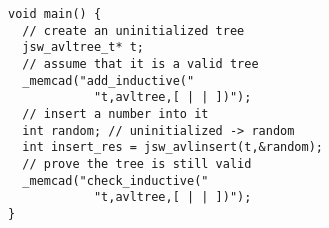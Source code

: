 \begin{verbatim}
void main() {
  // create an uninitialized tree
  jsw_avltree_t* t;
  // assume that it is a valid tree
  _memcad("add_inductive("
            "t,avltree,[ | | ])");
  // insert a number into it
  int random; // uninitialized -> random
  int insert_res = jsw_avlinsert(t,&random);
  // prove the tree is still valid
  _memcad("check_inductive("
            "t,avltree,[ | | ])");
}
\end{verbatim}
